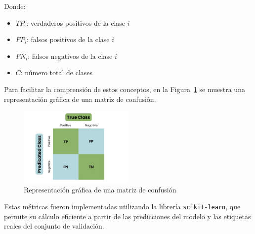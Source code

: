 Donde:
\begin{itemize}
      \item $TP_i$: verdaderos positivos de la clase $i$
      \item $FP_i$: falsos positivos de la clase $i$
      \item $FN_i$: falsos negativos de la clase $i$
      \item $C$: número total de clases
\end{itemize}

Para facilitar la comprensión de estos conceptos, en la Figura~\ref{fig:matriz-confusion} se muestra una representación gráfica de una matriz de confusión.
\begin{figure}[H]
      \centering
      \includegraphics[width=0.5\textwidth]{imagenes/matriz-de-confusion.png}
      \caption{Representación gráfica de una matriz de confusión}
      \label{fig:matriz-confusion}
\end{figure}

Estas métricas fueron implementadas utilizando la librería \texttt{scikit-learn}, que permite su cálculo eficiente a partir de las
predicciones del modelo y las etiquetas reales del conjunto de validación.
